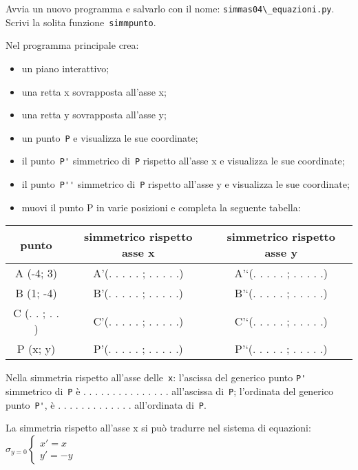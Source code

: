 Avvia un nuovo programma e salvarlo con il nome: 
\lstinline{simmas04\_equazioni.py}.
Scrivi la solita funzione~\lstinline{simmpunto}.

Nel programma principale crea:
\begin{itemize} [noitemsep]
\item un piano interattivo;
\item una retta x sovrapposta all'asse x;
\item una retta y sovrapposta all'asse y;
\item un punto~\lstinline{P} e visualizza le sue coordinate;
\item il punto~\lstinline{P'} simmetrico di~\lstinline{P} rispetto all'asse x
e visualizza le sue coordinate;
\item il punto~\lstinline{P''} simmetrico di~\lstinline{P} rispetto all'asse y
e visualizza le sue coordinate;
\item muovi il punto P in varie posizioni e completa la seguente tabella:

\end{itemize}

\begin{center}\begin{tabular}{|c|c|c|}
\hline

punto
 & 
simmetrico rispetto asse x
 & 
simmetrico rispetto asse y
\\
\hline
A (-4; 3)
 & 
A'(. . . . . ; . . . . .)
 & 
A'`(. . . . . ; . . . . .)
\\
\hline
B (1; -4)
 & 
B'(. . . . . ; . . . . .)
 & 
B'`(. . . . . ; . . . . .)
\\
\hline
C (. . ; . . )
 & 
C'(. . . . . ; . . . . .)
 & 
C'`(. . . . . ; . . . . .)
\\
\hline
P (x; y)
 & 
P'(. . . . . ; . . . . .)
 & 
P'`(. . . . . ; . . . . .)
\\
\hline\end{tabular}\end{center}


Nella simmetria rispetto all'asse delle~\lstinline{x}:
l'ascissa del generico punto \lstinline{P'} simmetrico di~\lstinline{P} è . . . 
. . . . . . . . 
. . . .
all'ascissa di~\lstinline{P}; l'ordinata del generico punto~\lstinline{P'}, è . 
. . . 
. . . . . . . . .
all'ordinata di~\lstinline{P}.

La simmetria rispetto all'asse x si può tradurre nel sistema di equazioni:
\(\sigma_{y = 0} \left \{
\begin{array}{l}
x' = x \\
y' = -y
\end{array} \right .\)

